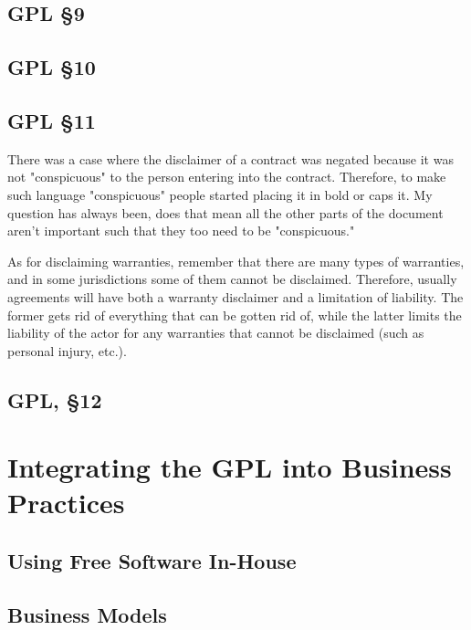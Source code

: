 \documentclass[12pt]{report}
\begin{document}
\section{GPL \S 9}
\label{GPLs9}

\section{GPL \S 10}
\label{GPLs10}

\section{GPL \S 11}
\label{GPLs11}

There was a case where the disclaimer of a contract was negated because it
was not "conspicuous" to the person entering into the contract.  Therefore,
to make such language "conspicuous" people started placing it in bold or caps it.  My question
has always been, does that mean all the other parts of the document aren't
important such that they too need to be "conspicuous."

As for disclaiming warranties, remember that there are many types of
warranties, and in some jurisdictions some of them cannot be disclaimed.
Therefore, usually agreements will have both a warranty disclaimer and a
limitation of liability.  The former gets rid of everything that can be
gotten rid of, while the latter limits the liability of the actor for any
warranties that cannot be disclaimed (such as personal injury, etc.).

\section{GPL, \S 12}
\label{GPLs12}

\chapter{Integrating the GPL into Business Practices}

\section{Using Free Software In-House}

\section{Business Models}
\label{Business Models}
\end{document}
